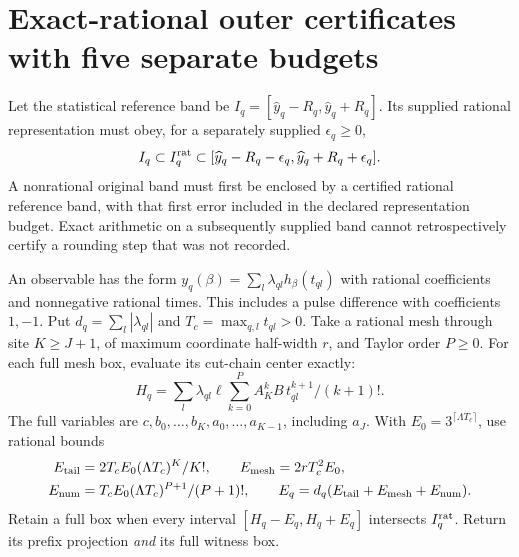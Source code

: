 \section{Exact-rational outer certificates with five separate budgets}
\label{sec:enclosures}
Let the statistical reference band be
$I_q=[\widehat y_q-R_q,\widehat y_q+R_q]$. Its supplied rational representation
must obey, for a separately supplied $\epsilon_q\ge0$,
\begin{equation}
 I_q\subset I_q^{\rm rat}\subset
 [\widehat y_q-R_q-\epsilon_q,\widehat y_q+R_q+\epsilon_q].
 \label{eq:representation}
\end{equation}
A nonrational original band must first be enclosed by a certified rational
reference band, with that first error included in the declared representation
budget. Exact arithmetic on a subsequently supplied band cannot retrospectively
certify a rounding step that was not recorded.

An observable has the form $y_q(\beta)=\sum_l\lambda_{ql}h_\beta(t_{ql})$
with rational coefficients and nonnegative rational times. This includes a
pulse difference with coefficients $1,-1$. Put $d_q=\sum_l|\lambda_{ql}|$
and $T_c=\max_{q,l}t_{ql}>0$. Take a rational mesh through site $K\ge J+1$,
of maximum coordinate half-width $r$, and Taylor order $P\ge0$. For each full
mesh box, evaluate its cut-chain center exactly:
\[
 H_q=\sum_l\lambda_{ql}\ell\sum_{k=0}^P A_K^kB\,
                  t_{ql}^{k+1}/(k+1)!.
\]
The full variables are $c,b_0,\ldots,b_K,a_0,\ldots,a_{K-1}$, including
$a_J$. With $E_0=3^{\lceil\Lambda T_c\rceil}$, use rational bounds
\begin{equation}
 \begin{split}
 E_{\rm tail}&=2T_cE_0(\Lambda T_c)^K/K!,\qquad
 E_{\rm mesh}=2rT_c^2E_0,\\
 E_{\rm num}&=T_cE_0(\Lambda T_c)^{P+1}/(P+1)!,\qquad
 E_q=d_q(E_{\rm tail}+E_{\rm mesh}+E_{\rm num}).
 \end{split}\label{eq:outer-errors}
\end{equation}
Retain a full box when every interval $[H_q-E_q,H_q+E_q]$ intersects
$I_q^{\rm rat}$. Return its prefix projection \emph{and} its full witness box.

